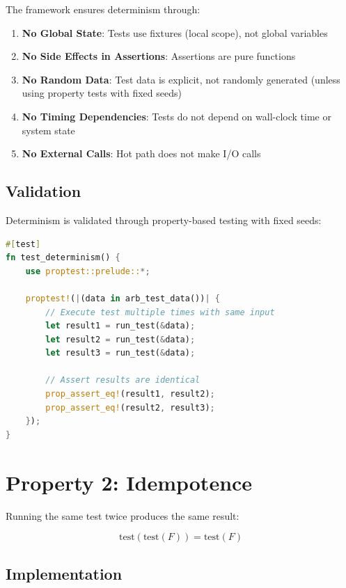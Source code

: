 The framework ensures determinism through:

\begin{enumerate}
  \item \textbf{No Global State}: Tests use fixtures (local scope), not global variables
  \item \textbf{No Side Effects in Assertions}: Assertions are pure functions
  \item \textbf{No Random Data}: Test data is explicit, not randomly generated (unless using property tests with fixed seeds)
  \item \textbf{No Timing Dependencies}: Tests do not depend on wall-clock time or system state
  \item \textbf{No External Calls}: Hot path does not make I/O calls
\end{enumerate}

\subsection{Validation}

Determinism is validated through property-based testing with fixed seeds:

\begin{lstlisting}[language=Rust]
#[test]
fn test_determinism() {
    use proptest::prelude::*;

    proptest!(|(data in arb_test_data())| {
        // Execute test multiple times with same input
        let result1 = run_test(&data);
        let result2 = run_test(&data);
        let result3 = run_test(&data);

        // Assert results are identical
        prop_assert_eq!(result1, result2);
        prop_assert_eq!(result2, result3);
    });
}
\end{lstlisting}

\section{Property 2: Idempotence}

\begin{theorem}
Running the same test twice produces the same result:

\begin{equation}
\text{test}(\text{test}(F)) = \text{test}(F)
\end{equation}
\end{theorem}

\subsection{Implementation}

